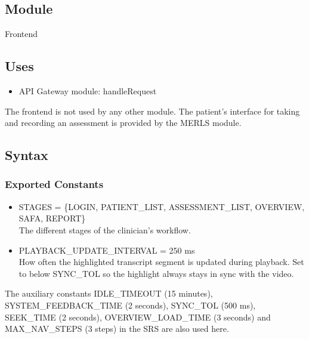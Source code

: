 \documentclass[12pt, titlepage]{article}
\begin{document}
\subsection{Module}
Frontend

\subsection{Uses}
\begin{itemize}
\item API Gateway module: handleRequest
\end{itemize}
The frontend is not used by any other module. The patient's interface for taking and recording an assessment is provided by the MERLS module.

\subsection{Syntax}

\subsubsection{Exported Constants}
\begin{itemize}
\item STAGES = \{LOGIN, PATIENT\_LIST, ASSESSMENT\_LIST, OVERVIEW, SAFA, REPORT\}\\
The different stages of the clinician's workflow.
\item PLAYBACK\_UPDATE\_INTERVAL = 250 ms\\
How often the highlighted transcript segment is updated during playback. Set to below SYNC\_TOL so the highlight always stays in sync with the video.
\end{itemize}
The auxiliary constants IDLE\_TIMEOUT (15 minutes), SYSTEM\_FEEDBACK\_TIME (2 seconds), 
SYNC\_TOL (500 ms), SEEK\_TIME (2 seconds), OVERVIEW\_LOAD\_TIME (3 seconds) and 
MAX\_NAV\_STEPS (3 steps) in the SRS are also used here.
\end{document}
